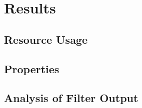 \section{Results}
\subsection{Resource Usage}
\subsection{Properties}
\subsection{Analysis of Filter Output }
